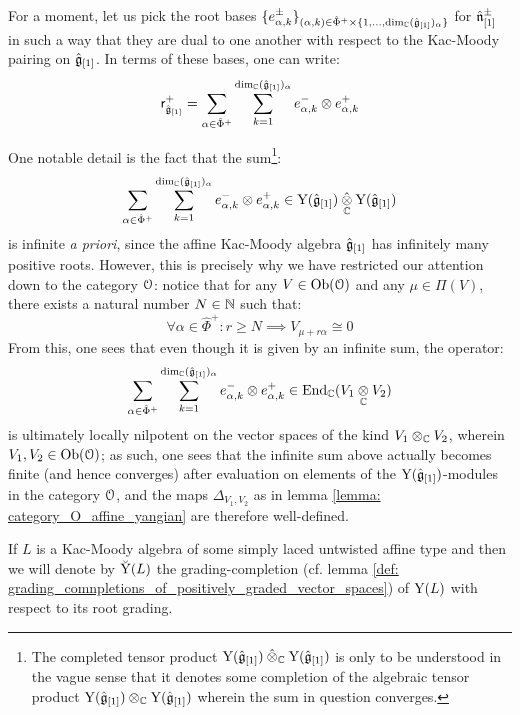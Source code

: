         \begin{remark}
            For a moment, let us pick the root bases $\{ e_{\alpha, k}^{\pm} \}_{(\alpha, k) \in \hat{\Phi}^+ \x \{1, ..., \dim_{\bbC} (\hat{\g}_{[1]})_{\alpha} \}}$ for $\hat{\mathfrak{n}}_{[1]}^{\pm}$ in such a way that they are dual to one another with respect to the Kac-Moody pairing on $\hat{\mathfrak{g}}_{[1]}$. In terms of these bases, one can write:
                $$\sfr_{\hat{\g}_{[1]}}^+ = \sum_{\alpha \in \hat{\Phi}^+} \sum_{k = 1}^{ \dim_{\bbC} (\hat{\g}_{[1]})_{\alpha} } e_{\alpha, k}^- \tensor e_{\alpha, k}^+$$
        
            One notable detail is the fact that the sum\footnote{The completed tensor product $\rmY(\hat{\g}_{[1]}) \hattensor_{\bbC} \rmY(\hat{\g}_{[1]})$ is only to be understood in the vague sense that it denotes some completion of the algebraic tensor product $\rmY(\hat{\g}_{[1]}) \tensor_{\bbC} \rmY(\hat{\g}_{[1]})$ wherein the sum in question converges.}:
                $$\sum_{\alpha \in \hat{\Phi}^+} \sum_{k = 1}^{ \dim_{\bbC} (\hat{\g}_{[1]})_{\alpha} } e_{\alpha, k}^- \tensor e_{\alpha, k}^+ \in \rmY(\hat{\g}_{[1]}) \hattensor_{\bbC} \rmY(\hat{\g}_{[1]})$$
            is infinite \textit{a priori}, since the affine Kac-Moody algebra $\hat{\mathfrak{g}}_{[1]}$ has infinitely many positive roots. However, this is precisely why we have restricted our attention down to the category $\mathcal{O}$: notice that for any $V \in \mathrm{Ob}(\mathcal{O})$ and any $\mu \in \Pi(V)$, there exists a natural number $N \in \mathbb{N}$ such that:
                $$\forall \alpha \in \hat{\Phi}^+: r \geq N \implies V_{\mu + r \alpha} \cong 0$$
            From this, one sees that even though it is given by an infinite sum, the operator:
                $$\sum_{\alpha \in \hat{\Phi}^+} \sum_{k = 1}^{ \dim_{\bbC} (\hat{\g}_{[1]})_{\alpha} } e_{\alpha, k}^- \tensor e_{\alpha, k}^+ \in \End_{\bbC}(V_1 \tensor_{\bbC} V_2)$$
            is ultimately locally nilpotent on the vector spaces of the kind $V_1 \tensor_{\bbC} V_2$, wherein $V_1, V_2 \in \mathrm{Ob}(\mathcal{O})$; as such, one sees that the infinite sum above actually becomes finite (and hence converges) after evaluation on elements of the $\mathrm{Y}(\hat{\mathfrak{g}}_{[1]})$-modules in the category $\mathcal{O}$, and the maps $\Delta_{V_1, V_2}$ as in lemma \ref{lemma: category_O_affine_yangian} are therefore well-defined. 
        \end{remark}
        \begin{convention}
            If $L$ is a Kac-Moody algebra of some simply laced untwisted affine type and then we will denote by $\breve{\mathrm{Y}}(L)$ the grading-completion (cf. lemma \ref{def: grading_comnpletions_of_positively_graded_vector_spaces}) of $\mathrm{Y}(L)$ with respect to its root grading.
        \end{convention}
